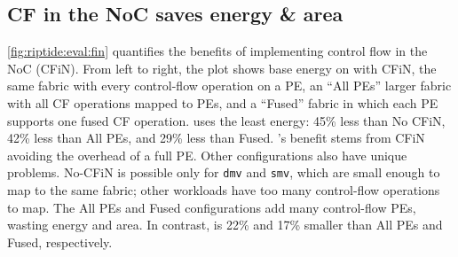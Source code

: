 \figRipTideFINResults
\subsection{CF in the NoC saves energy \& area}
\autoref{fig:riptide:eval:fin} quantifies the benefits of implementing control flow in the NoC (CFiN).
% 
From left to right, the plot shows base energy on \riptide with CFiN,
the same fabric with every control-flow operation on a PE,
an ``All PEs'' larger fabric with all CF operations mapped to PEs,
and a ``Fused'' fabric in which each PE supports one fused CF operation.
% 
\riptide uses the least energy: 45\% less than No CFiN, 42\% less than All PEs, and 29\% less than Fused.
% 
\riptide's benefit stems from CFiN avoiding the overhead of a full PE.
%
Other configurations also have unique problems.
% 
No-CFiN is possible only for {\tt dmv} and {\tt smv}, which are small enough to map to the
same \riptide fabric; other workloads have too many control-flow operations to map.
% 
The All PEs and Fused configurations add many control-flow PEs, wasting energy and area.
% 
In contrast, \riptide is 22\% and 17\% smaller than All PEs and Fused, respectively.
